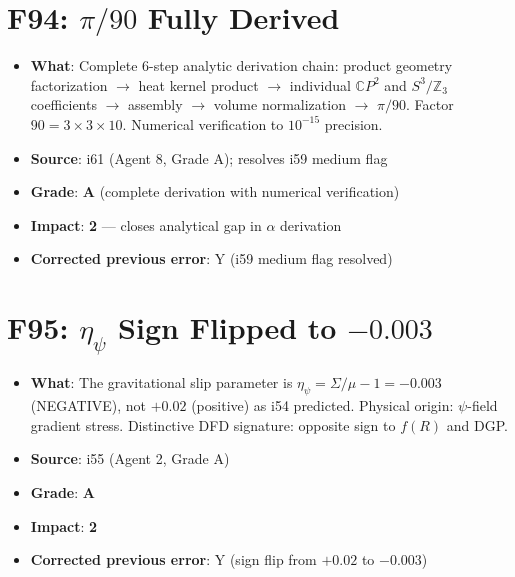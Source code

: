 \documentclass[11pt,a4paper]{article}
\newcommand{\grade}[1]{\textbf{#1}}
\newcommand{\impact}[1]{\textbf{#1}}
\begin{document}
\section{F94: $\pi/90$ Fully Derived}
\begin{itemize}[nosep]
\item \textbf{What}: Complete 6-step analytic derivation chain: product geometry factorization $\to$ heat kernel product $\to$ individual $\mathbb{C}P^2$ and $S^3/\mathbb{Z}_3$ coefficients $\to$ assembly $\to$ volume normalization $\to$ $\pi/90$. Factor $90 = 3 \times 3 \times 10$. Numerical verification to $10^{-15}$ precision.
\item \textbf{Source}: i61 (Agent 8, Grade A); resolves i59 medium flag
\item \textbf{Grade}: \grade{A} (complete derivation with numerical verification)
\item \textbf{Impact}: \impact{2} --- closes analytical gap in $\alpha$ derivation
\item \textbf{Corrected previous error}: Y (i59 medium flag resolved)
\end{itemize}

\section{F95: $\eta_\psi$ Sign Flipped to $-0.003$}
\begin{itemize}[nosep]
\item \textbf{What}: The gravitational slip parameter is $\eta_\psi = \Sigma/\mu - 1 = -0.003$ (NEGATIVE), not $+0.02$ (positive) as i54 predicted. Physical origin: $\psi$-field gradient stress. Distinctive DFD signature: opposite sign to $f(R)$ and DGP.
\item \textbf{Source}: i55 (Agent 2, Grade A)
\item \textbf{Grade}: \grade{A}
\item \textbf{Impact}: \impact{2}
\item \textbf{Corrected previous error}: Y (sign flip from $+0.02$ to $-0.003$)
\end{itemize}


\end{document}
